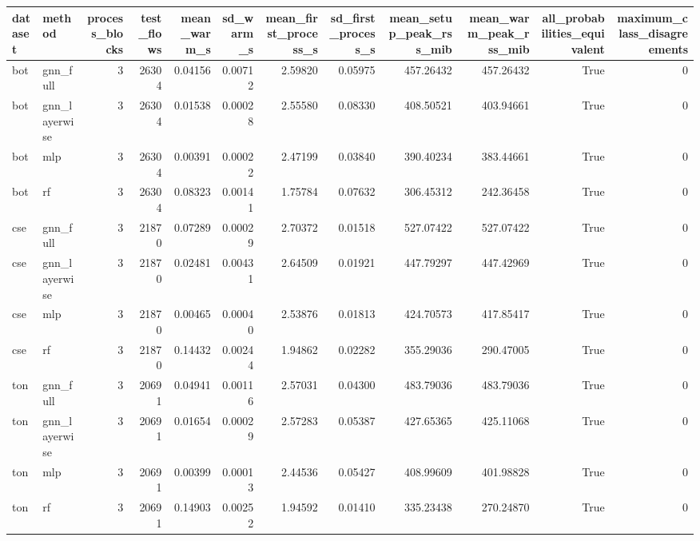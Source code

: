 \begin{tabular}{llrrrrrrrrrr}
\toprule
dataset & method & process_blocks & test_flows & mean_warm_s & sd_warm_s & mean_first_process_s & sd_first_process_s & mean_setup_peak_rss_mib & mean_warm_peak_rss_mib & all_probabilities_equivalent & maximum_class_disagreements \\
\midrule
bot & gnn_full & 3 & 26304 & 0.04156 & 0.00712 & 2.59820 & 0.05975 & 457.26432 & 457.26432 & True & 0 \\
bot & gnn_layerwise & 3 & 26304 & 0.01538 & 0.00028 & 2.55580 & 0.08330 & 408.50521 & 403.94661 & True & 0 \\
bot & mlp & 3 & 26304 & 0.00391 & 0.00022 & 2.47199 & 0.03840 & 390.40234 & 383.44661 & True & 0 \\
bot & rf & 3 & 26304 & 0.08323 & 0.00141 & 1.75784 & 0.07632 & 306.45312 & 242.36458 & True & 0 \\
cse & gnn_full & 3 & 21870 & 0.07289 & 0.00029 & 2.70372 & 0.01518 & 527.07422 & 527.07422 & True & 0 \\
cse & gnn_layerwise & 3 & 21870 & 0.02481 & 0.00431 & 2.64509 & 0.01921 & 447.79297 & 447.42969 & True & 0 \\
cse & mlp & 3 & 21870 & 0.00465 & 0.00040 & 2.53876 & 0.01813 & 424.70573 & 417.85417 & True & 0 \\
cse & rf & 3 & 21870 & 0.14432 & 0.00244 & 1.94862 & 0.02282 & 355.29036 & 290.47005 & True & 0 \\
ton & gnn_full & 3 & 20691 & 0.04941 & 0.00116 & 2.57031 & 0.04300 & 483.79036 & 483.79036 & True & 0 \\
ton & gnn_layerwise & 3 & 20691 & 0.01654 & 0.00029 & 2.57283 & 0.05387 & 427.65365 & 425.11068 & True & 0 \\
ton & mlp & 3 & 20691 & 0.00399 & 0.00013 & 2.44536 & 0.05427 & 408.99609 & 401.98828 & True & 0 \\
ton & rf & 3 & 20691 & 0.14903 & 0.00252 & 1.94592 & 0.01410 & 335.23438 & 270.24870 & True & 0 \\
\bottomrule
\end{tabular}
